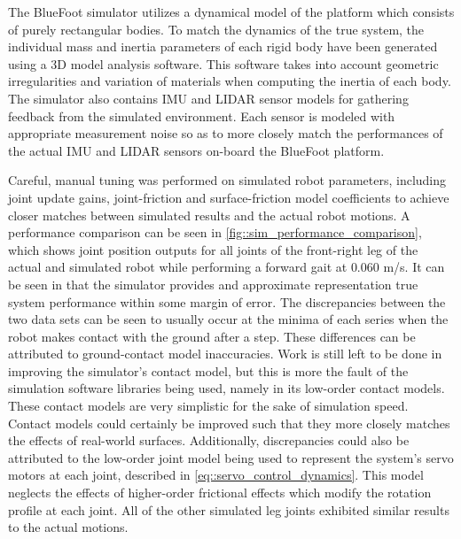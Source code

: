 		The BlueFoot simulator utilizes a dynamical model of the platform which consists of purely rectangular bodies. To match the dynamics of the true system, the individual mass and inertia parameters of each rigid body have been generated using a 3D model analysis software. This software takes into account geometric irregularities and variation of materials when computing the inertia of each body. The simulator also contains IMU and LIDAR sensor models for gathering feedback from the simulated environment. Each sensor is modeled with appropriate measurement noise so as to more closely match the performances of the actual IMU and LIDAR sensors on-board the BlueFoot platform.

		Careful, manual tuning was performed on simulated robot parameters, including joint update gains, joint-friction and surface-friction model coefficients to achieve closer matches between simulated results and the actual robot motions. A performance comparison can be seen in \ref{fig::sim_performance_comparison}, which shows joint position outputs for all joints of the front-right leg of the actual and simulated robot while performing a forward gait at $0.060$ m/s. It can be seen in  that the simulator provides and approximate representation true system performance within some margin of error. The discrepancies between the two data sets can be seen to usually occur at the minima of each series when the robot makes contact with the ground after a step. These differences can be attributed to ground-contact model inaccuracies. Work is still left to be done in improving the simulator's contact model, but this is more the fault of the simulation software libraries being used, namely in its low-order contact models. These contact models are very simplistic for the sake of simulation speed. Contact models could certainly be improved such that they more closely matches the effects of real-world surfaces. Additionally, discrepancies could also be attributed to the low-order joint model being used to represent the system's servo motors at each joint, described in \ref{eq::servo_control_dynamics}. This model neglects the effects of higher-order frictional effects which modify the rotation profile at each joint. All of the other simulated leg joints exhibited similar results to the actual motions.
